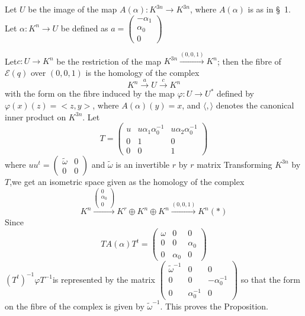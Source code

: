 \begin{Proof}
Let $U$ be the image of the map $A(\alpha):K^{3n}\to K^{3n}$, where $A(\alpha)$ is as in \S\ 1. Let $\alpha:K^{n}\to U$ be defined as $a=\begin{pmatrix}
-\alpha_1\\
\alpha_0\\
0
\end{pmatrix}$

Let\pageoriginale $c:U\to K^{n}$ be the restriction of the map $K^{3n}\xrightarrow{(0,0,1)}K^{n}$; then the fibre of $\mathscr{E}(q)$ over $(0,0,1)$ is the homology of the complex 
$$
K^{n}\xrightarrow{a}U\xrightarrow{c}K^{n}
$$
with the form on the fibre induced by the map $\varphi:U\to U^{\ast}$
defined by $\varphi(x)(z)=<z,y>$, where $A(\alpha)(y)=x$, and $\langle ,\rangle$ denotes the canonical inner product on $K^{3n}$. Let 
$$
T=
\begin{pmatrix}
u & u\alpha_1\alpha^{-1}_0&u\alpha_2\alpha_0^{-1}\\
0 & 1 & 0\\
0 & 0 &1
\end{pmatrix}
$$
where $u u^{t}=\begin{pmatrix}
\widetilde{\omega} & 0\\
0 & 0
\end{pmatrix}$ and $\widetilde{\omega}$ is an invertible $r$ by $r$ matrix Transforming $K^{3n}$ by $T$,we get an isometric space given as the homology of the complex 
$$
K^{n}\xrightarrow{\begin{pmatrix}
0\\
\alpha_0\\
0
  \end{pmatrix}
} K^{r}\oplus K^{n}\oplus K^{n}\xrightarrow{(0,0,1)} K^{n}(\ast)
$$
Since 
$$
TA(\alpha)T^{t}=
\begin{pmatrix}
\omega & 0 & 0\\
0 & 0 &\alpha_0\\
0 & \alpha_0 & 0
\end{pmatrix}
$$
$\left(T^{t}\right)^{-1}\varphi T^{-1}$\pageoriginale is represented by the matrix $\begin{pmatrix}
\widetilde{\omega}^{-1} &  0 & 0\\
0 & 0 &-\alpha^{-1}_0\\
0 & \alpha^{-1}_0 &0
\end{pmatrix}$ so that the form on the fibre of the complex is given by $\widetilde\omega^{-1}$. This proves the Proposition. 


\end{Proof}
